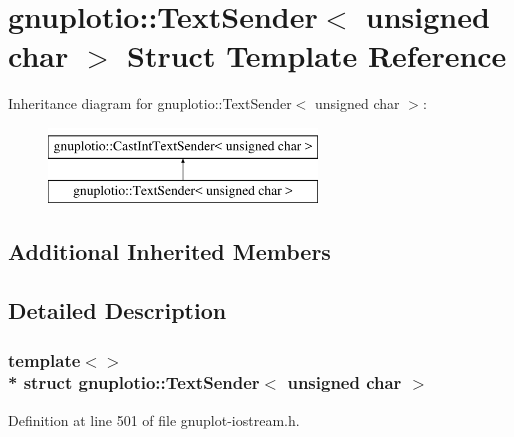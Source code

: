 \hypertarget{structgnuplotio_1_1_text_sender_3_01unsigned_01char_01_4}{}\section{gnuplotio\+:\+:Text\+Sender$<$ unsigned char $>$ Struct Template Reference}
\label{structgnuplotio_1_1_text_sender_3_01unsigned_01char_01_4}
Inheritance diagram for gnuplotio\+:\+:Text\+Sender$<$ unsigned char $>$\+:\begin{figure}[H]
\begin{center}
\leavevmode
\includegraphics[height=2.000000cm]{structgnuplotio_1_1_text_sender_3_01unsigned_01char_01_4}
\end{center}
\end{figure}
\subsection*{Additional Inherited Members}


\subsection{Detailed Description}
\subsubsection*{template$<$$>$\\*
struct gnuplotio\+::\+Text\+Sender$<$ unsigned char $>$}



Definition at line 501 of file gnuplot-\/iostream.\+h.

